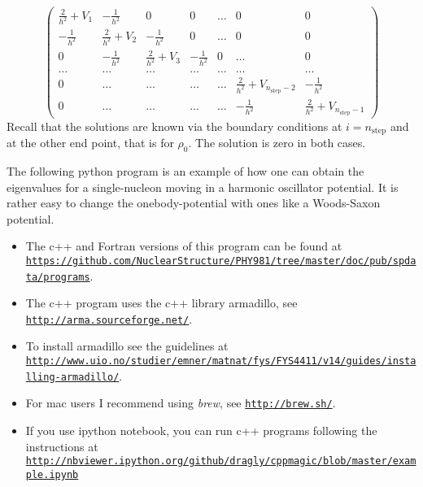 \documentclass[graybox,sectrefs,envcountresetchap,open=right]{svmonodo}
\begin{document}
\begin{equation}
    \left( \begin{array}{ccccccc} \frac{2}{h^2}+V_1 & -\frac{1}{h^2} & 0   & 0    & \dots  &0     & 0 \\
                                -\frac{1}{h^2} & \frac{2}{h^2}+V_2 & -\frac{1}{h^2} & 0    & \dots  &0     &0 \\
                                0   & -\frac{1}{h^2} & \frac{2}{h^2}+V_3 & -\frac{1}{h^2}  &0       &\dots & 0\\
                                \dots  & \dots & \dots & \dots  &\dots      &\dots & \dots\\
                                0   & \dots & \dots & \dots  &\dots       &\frac{2}{h^2}+V_{n_{\mathrm{step}}-2} & -\frac{1}{h^2}\\
                                0   & \dots & \dots & \dots  &\dots       &-\frac{1}{h^2} & \frac{2}{h^2}+V_{n_{\mathrm{step}}-1}

             \end{array} \right)  
\label{eq:matrixse} 
\end{equation} 
Recall that the solutions are known via the boundary conditions at
$i=n_{\mathrm{step}}$ and at the other end point, that is for  $\rho_0$.
The solution is zero in both cases.



The following python program is an example of how one can obtain the eigenvalues for a single-nucleon moving in a harmonic oscillator potential. It is rather easy to change the onebody-potential with ones like a Woods-Saxon potential. 


\begin{itemize}
\item The c++ and Fortran versions of this program can be found at \href{{https://github.com/NuclearStructure/PHY981/tree/master/doc/pub/spdata/programs}}{\nolinkurl{https://github.com/NuclearStructure/PHY981/tree/master/doc/pub/spdata/programs}}. 

\item The c++  program uses the c++ library armadillo, see \href{{http://arma.sourceforge.net/}}{\nolinkurl{http://arma.sourceforge.net/}}. 

\item To install armadillo see the guidelines at \href{{http://www.uio.no/studier/emner/matnat/fys/FYS4411/v14/guides/installing-armadillo/}}{\nolinkurl{http://www.uio.no/studier/emner/matnat/fys/FYS4411/v14/guides/installing-armadillo/}}. 

\item For mac users I recommend using \emph{brew}, see \href{{http://brew.sh/}}{\nolinkurl{http://brew.sh/}}.

\item If you use ipython notebook, you can run c++ programs following the instructions at \href{{http://nbviewer.ipython.org/github/dragly/cppmagic/blob/master/example.ipynb}}{\nolinkurl{http://nbviewer.ipython.org/github/dragly/cppmagic/blob/master/example.ipynb}}
\end{itemize}
\end{document}
